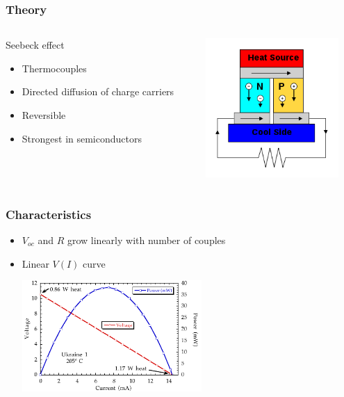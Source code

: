 \documentclass{beamer}
\begin{document}
\begin{frame}
\begin{columns}
\end{columns}

\end{frame}


\begin{frame}
  \frametitle{Theory}
\begin{columns}
  
\begin{column}{.5\textwidth}
\begin{block}{Seebeck effect}
  \begin{itemize}
    \item Thermocouples
    \item Directed diffusion of charge carriers
    \item Reversible
    \item Strongest in semiconductors
  \end{itemize}
\end{block}
\end{column}

\begin{column}{.5\textwidth}
\begin{block}{}
\includegraphics[height=150pt]{./Slike/TEG-couple}
\end{block}
\end{column}
\end{columns}
\end{frame}

\begin{frame}
  \frametitle{Characteristics}
\begin{itemize}
  \item $V_{oc}$ and $R$ grow linearly with number of couples
  \item Linear $V(I)$ curve

\begin{center}
  \includegraphics[height=120pt]{./Slike/TEG-curve}
\end{center}
 
\end{itemize}

\end{frame}
\end{document}
